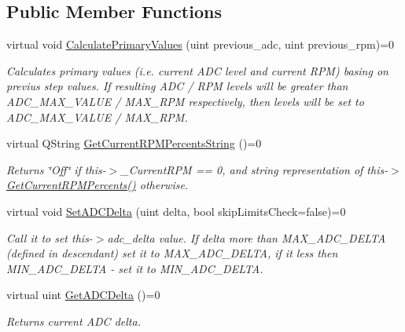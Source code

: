 \subsection*{Public Member Functions}
\begin{DoxyCompactItemize}
\item 
virtual void \hyperlink{class_interfaces_1_1_i_settings_step_a04e46c3ebe1f28e0ad0bce23fb863f66}{Calculate\+Primary\+Values} (uint previous\+\_\+adc, uint previous\+\_\+rpm)=0
\begin{DoxyCompactList}\small\item\em Calculates primary values (i.\+e. current A\+DC level and current R\+PM) basing on previus step values. If resulting A\+DC / R\+PM levels will be greater than A\+D\+C\+\_\+\+M\+A\+X\+\_\+\+V\+A\+L\+UE / M\+A\+X\+\_\+\+R\+PM respectively, then levels will be set to A\+D\+C\+\_\+\+M\+A\+X\+\_\+\+V\+A\+L\+UE / M\+A\+X\+\_\+\+R\+PM. \end{DoxyCompactList}\item 
virtual Q\+String \hyperlink{class_interfaces_1_1_i_settings_step_a7575d43b7d178d700e161ec48e2c766f}{Get\+Current\+R\+P\+M\+Percents\+String} ()=0
\begin{DoxyCompactList}\small\item\em Returns \char`\"{}\+Off\char`\"{} if this-\/$>$\+\_\+\+Current\+R\+PM == 0, and string representation of this-\/$>$\hyperlink{class_interfaces_1_1_i_settings_step_abbbb49e91352212c6201a85f1a22253f}{Get\+Current\+R\+P\+M\+Percents()} otherwise. \end{DoxyCompactList}\item 
virtual void \hyperlink{class_interfaces_1_1_i_settings_step_a83f00b8b66f6566721065e34e41508c6}{Set\+A\+D\+C\+Delta} (uint delta, bool skip\+Limits\+Check=false)=0
\begin{DoxyCompactList}\small\item\em Call it to set this-\/$>$adc\+\_\+delta value. If delta more than M\+A\+X\+\_\+\+A\+D\+C\+\_\+\+D\+E\+L\+TA (defined in descendant) set it to M\+A\+X\+\_\+\+A\+D\+C\+\_\+\+D\+E\+L\+TA, if it less then M\+I\+N\+\_\+\+A\+D\+C\+\_\+\+D\+E\+L\+TA -\/ set it to M\+I\+N\+\_\+\+A\+D\+C\+\_\+\+D\+E\+L\+TA. \end{DoxyCompactList}\item 
virtual uint \hyperlink{class_interfaces_1_1_i_settings_step_ab77c6eaa45707ec4932a8f432b13ad78}{Get\+A\+D\+C\+Delta} ()=0
\begin{DoxyCompactList}\small\item\em Returns current A\+DC delta. \end{DoxyCompactList}\item 

\end{DoxyCompactItemize}
